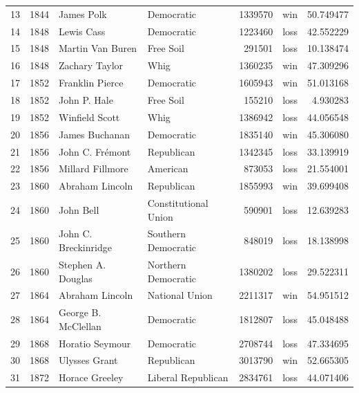 \documentclass[
  letterpaper,
  DIV=11,
  numbers=noendperiod]{scrreprt}
\begin{document}
\begin{tabular}{lrllrlr}
13  &  1844 &              James Polk &             Democratic &       1339570 &    win &  50.749477 \\
14  &  1848 &              Lewis Cass &             Democratic &       1223460 &   loss &  42.552229 \\
15  &  1848 &        Martin Van Buren &              Free Soil &        291501 &   loss &  10.138474 \\
16  &  1848 &          Zachary Taylor &                   Whig &       1360235 &    win &  47.309296 \\
17  &  1852 &         Franklin Pierce &             Democratic &       1605943 &    win &  51.013168 \\
18  &  1852 &            John P. Hale &              Free Soil &        155210 &   loss &   4.930283 \\
19  &  1852 &          Winfield Scott &                   Whig &       1386942 &   loss &  44.056548 \\
20  &  1856 &          James Buchanan &             Democratic &       1835140 &    win &  45.306080 \\
21  &  1856 &         John C. Frémont &             Republican &       1342345 &   loss &  33.139919 \\
22  &  1856 &        Millard Fillmore &               American &        873053 &   loss &  21.554001 \\
23  &  1860 &         Abraham Lincoln &             Republican &       1855993 &    win &  39.699408 \\
24  &  1860 &               John Bell &   Constitutional Union &        590901 &   loss &  12.639283 \\
25  &  1860 &    John C. Breckinridge &    Southern Democratic &        848019 &   loss &  18.138998 \\
26  &  1860 &      Stephen A. Douglas &    Northern Democratic &       1380202 &   loss &  29.522311 \\
27  &  1864 &         Abraham Lincoln &         National Union &       2211317 &    win &  54.951512 \\
28  &  1864 &     George B. McClellan &             Democratic &       1812807 &   loss &  45.048488 \\
29  &  1868 &         Horatio Seymour &             Democratic &       2708744 &   loss &  47.334695 \\
30  &  1868 &           Ulysses Grant &             Republican &       3013790 &    win &  52.665305 \\
31  &  1872 &          Horace Greeley &     Liberal Republican &       2834761 &   loss &  44.071406 \\

\end{tabular}
\end{document}
